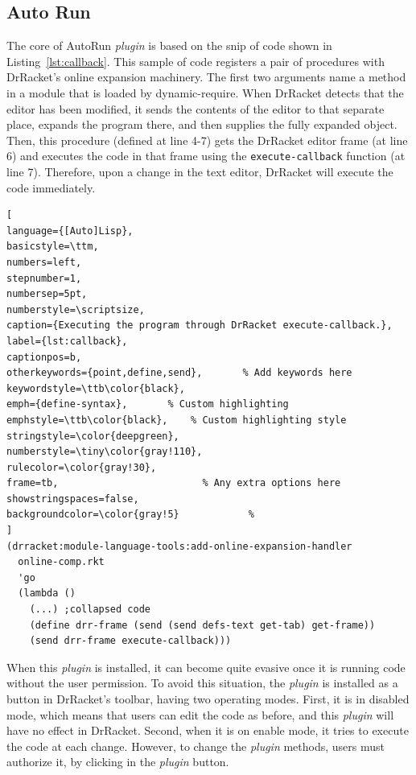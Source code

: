 \subsection{Auto Run}

The core of AutoRun \textit{plugin} is based on the snip of code shown in Listing~\ref{lst:callback}. This sample of code registers a pair of procedures with DrRacket’s online expansion machinery. The first two arguments name a method in a module that is loaded by dynamic-require. When DrRacket detects that the editor has been modified, it sends the contents of the editor to that separate place, expands the program there, and then supplies the fully expanded object. Then, this procedure (defined at line 4-7) gets the DrRacket editor frame (at line 6) and executes the code in that frame using the \texttt{execute-callback} function (at line 7). Therefore, upon a change in the text editor, DrRacket will execute the code immediately. 

\begin{lstlisting}[
language={[Auto]Lisp},
basicstyle=\ttm,
numbers=left,
stepnumber=1,
numbersep=5pt,                   
numberstyle=\scriptsize, 
caption={Executing the program through DrRacket execute-callback.},
label={lst:callback},
captionpos=b, 
otherkeywords={point,define,send},       % Add keywords here
keywordstyle=\ttb\color{black},
emph={define-syntax},       % Custom highlighting
emphstyle=\ttb\color{black},    % Custom highlighting style
stringstyle=\color{deepgreen},
numberstyle=\tiny\color{gray!110},
rulecolor=\color{gray!30},
frame=tb,                         % Any extra options here
showstringspaces=false,
backgroundcolor=\color{gray!5}            % 
]
(drracket:module-language-tools:add-online-expansion-handler
  online-comp.rkt
  'go
  (lambda ()
    (...) ;collapsed code
    (define drr-frame (send (send defs-text get-tab) get-frame))
    (send drr-frame execute-callback)))
\end{lstlisting}

When this \textit{plugin} is installed, it can become quite evasive once it is running code without the user permission. To avoid this situation, the \textit{plugin} is installed as a button in DrRacket's toolbar, having two operating modes. First, it is in disabled mode, which means that users can edit the code as before, and this \textit{plugin} will have no effect in DrRacket. Second, when it is on enable mode, it tries to execute the code at each change. However, to change the \textit{plugin} methods, users must authorize it, by clicking in the \textit{plugin} button.

